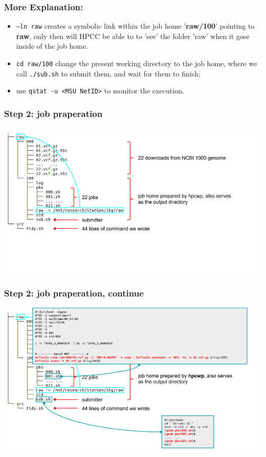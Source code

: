\documentclass{beamer}
\begin{document}
\begin{frame}
\frametitle{More Explanation:}
\begin{itemize}
\item {\color{red}\texttt{--ln raw}} creates a symbolic link within the job home
  '\textbf{raw/100}' pointing to \textbf{raw}, only then will HPCC be
  able to to 'see' the folder 'raw' when it gose inside of the job
  home.
\item {\color{red}\texttt{cd raw/100}} change the present working
  directory to the job home, where we call
  {\color{red}\texttt{./sub.sh}} to submit them, and wait for them to
  finish;
\item use \texttt{qstat -u <MSU NetID>} to monitor the execution.
\end{itemize}
\end{frame}
\begin{frame}
  \frametitle{Step 2: job praperation}
  \includegraphics[width=1.0\linewidth]{img/step_2_a}
\end{frame}
\begin{frame}
  \frametitle{Step 2: job praperation, continue}
  \includegraphics[width=1.0\linewidth]{img/step_2_b}
\end{frame}
\end{document}
